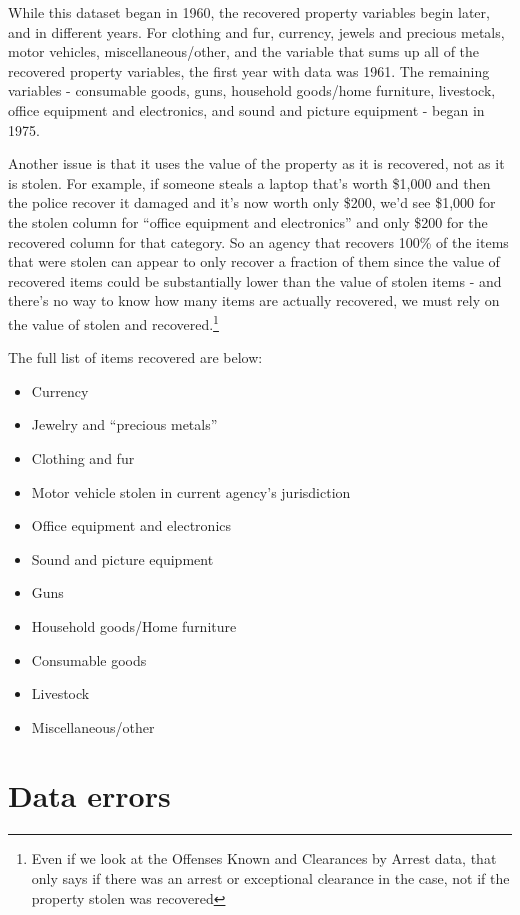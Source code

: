 \documentclass[
  12pt,
  openany]{book}
\providecommand{\tightlist}{%
  \setlength{\itemsep}{0pt}\setlength{\parskip}{0pt}}
\begin{document}
While this dataset began in 1960, the recovered property variables begin later, and in different years. For clothing and fur, currency, jewels and precious metals, motor vehicles, miscellaneous/other, and the variable that sums up all of the recovered property variables, the first year with data was 1961. The remaining variables - consumable goods, guns, household goods/home furniture, livestock, office equipment and electronics, and sound and picture equipment - began in 1975.

Another issue is that it uses the value of the property as it is recovered, not as it is stolen. For example, if someone steals a laptop that's worth \$1,000 and then the police recover it damaged and it's now worth only \$200, we'd see \$1,000 for the stolen column for ``office equipment and electronics'' and only \$200 for the recovered column for that category. So an agency that recovers 100\% of the items that were stolen can appear to only recover a fraction of them since the value of recovered items could be substantially lower than the value of stolen items - and there's no way to know how many items are actually recovered, we must rely on the value of stolen and recovered.\footnote{Even if we look at the Offenses Known and Clearances by Arrest data, that only says if there was an arrest or exceptional clearance in the case, not if the property stolen was recovered}

The full list of items recovered are below:

\begin{itemize}
\tightlist
\item
  Currency
\item
  Jewelry and ``precious metals''
\item
  Clothing and fur
\item
  Motor vehicle stolen in current agency's jurisdiction
\item
  Office equipment and electronics
\item
  Sound and picture equipment
\item
  Guns
\item
  Household goods/Home furniture
\item
  Consumable goods
\item
  Livestock
\item
  Miscellaneous/other
\end{itemize}

\section{Data errors}\label{data-errors}
\end{document}
